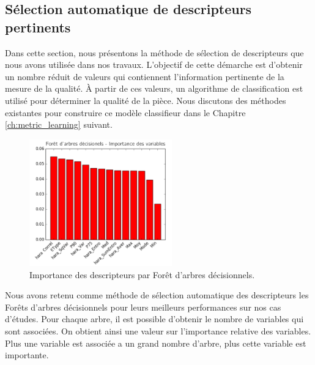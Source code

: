 \subsection{Sélection automatique de descripteurs pertinents} \label{subsec:features_selection}
Dans cette section, nous présentons la méthode de sélection de descripteurs que nous avons utilisée dans nos travaux.
L'objectif de cette démarche est d'obtenir un nombre réduit de valeurs qui contiennent l'information pertinente de la mesure de la qualité.
À partir de ces valeurs, un algorithme de classification est utilisé pour déterminer la qualité de la pièce.
Nous discutons des méthodes existantes pour construire ce modèle classifieur dans le Chapitre \ref{ch:metric_learning} suivant.

\begin{figure}[bth]
	\centering
	\includegraphics[width=0.55\textwidth,height=\textheight,keepaspectratio]{../Chap3/Figures/random_forest_importance.png}
	\caption{Importance des descripteurs par Forêt d'arbres décisionnels.}
	\label{fig:random_forest}
\end{figure}

Nous avons retenu comme méthode de sélection automatique des descripteurs les Forêts d'arbres décisionnels pour leurs meilleurs performances sur nos cas d'études.
Pour chaque arbre, il est possible d'obtenir le nombre de variables qui sont associées.
On obtient ainsi une valeur sur l'importance relative des variables.
Plus une variable est associée a un grand nombre d'arbre, plus cette variable est importante.

